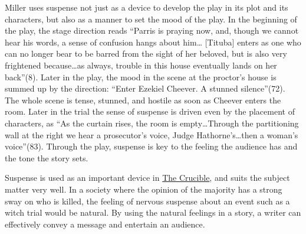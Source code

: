 \documentclass[12pt]{article}
\begin{document}
	Miller uses suspense not just as a device to develop the play in its plot and
	its characters, but also as a manner to set the mood of the play.  In the 
	beginning of the play, the stage direction reads ``Parris is praying now, and,
	though we cannot hear his words, a sense of confusion hangs about him\ldots 
	[Tituba] enters as one who can no longer bear to be barred from the sight of
	her beloved, but is also very frightened because\ldots as always, trouble in
	this house eventually lands on her back''(8).  Later in the play, the mood in
	the scene at the proctor's house is summed up by the direction: ``Enter
	Ezekiel Cheever.  A stunned silence''(72).  The whole scene is tense, stunned,
	and hostile as soon as Cheever enters the room.  Later in the trial the sense
	of suspense is driven even by the placement of characters, as ``As the curtain
	rises, the room is empty\ldots Through the partitioning wall at the right we 
	hear a prosecutor's voice, Judge Hathorne's\ldots then a woman's voice''(83).
	Through the play, suspense is key to the feeling the audience has and the
	tone the story sets.

	Suspense is used as an important device in \underline{The Crucible}, and suits
	the subject matter very well.  In a society where the opinion of the majority 
	has a strong sway on who is killed, the feeling of nervous suspense about an
	event such as a witch trial would be natural.  By using the natural
	feelings in a story, a writer can effectively convey a message and 
	entertain an audience.
\end{document}
